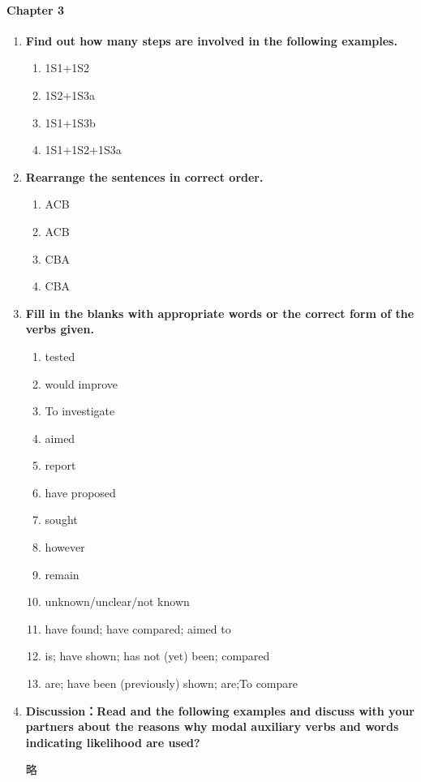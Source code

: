 \documentclass{ctexbook}
\begin{document}
\paragraph*{Chapter 3}\par
\begin{enumerate}
  \item \textbf{Find out how many steps are involved in the following examples.}
  \begin{enumerate}
    \item 1S1+1S2
    \item 1S2+1S3a
    \item 1S1+1S3b
    \item 1S1+1S2+1S3a
  \end{enumerate}

  \item \textbf{Rearrange the sentences in correct order.}
  \begin{enumerate}
    \item ACB
    \item ACB
    \item CBA
    \item CBA
  \end{enumerate}

  \item \textbf{Fill in the blanks with appropriate words or the correct form of the verbs given.}
  \begin{enumerate}
    \item tested
    \item would improve
    \item To investigate
    \item aimed
    \item report
    \item have proposed
    \item sought
    \item however
    \item remain
    \item unknown/unclear/not known
    \item have found; have compared; aimed to
    \item is; have shown; has not (yet) been; compared
    \item are; have been (previously) shown; are;To compare
  \end{enumerate}

  \item \textbf{Discussion：Read and the following examples and discuss with your partners about the reasons why modal auxiliary verbs and words indicating likelihood are used?}
  
  略
\end{enumerate}
\end{document}
